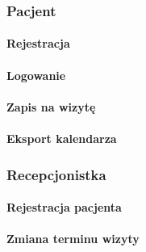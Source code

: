 \documentclass[polish,12pt]{aghthesis}
\begin{document}
\subsubsection{Pacjent}
\paragraph{Rejestracja}{}
\paragraph{Logowanie}{}
\paragraph{Zapis na wizytę}{}
\paragraph{Eksport kalendarza}{}
\subsubsection{Recepcjonistka}
\paragraph{Rejestracja pacjenta}{}
\paragraph{Zmiana terminu wizyty}{}


\nocite{artykul2011,ksiazka2011,narzedzie2011,projekt2011}


\end{document}
